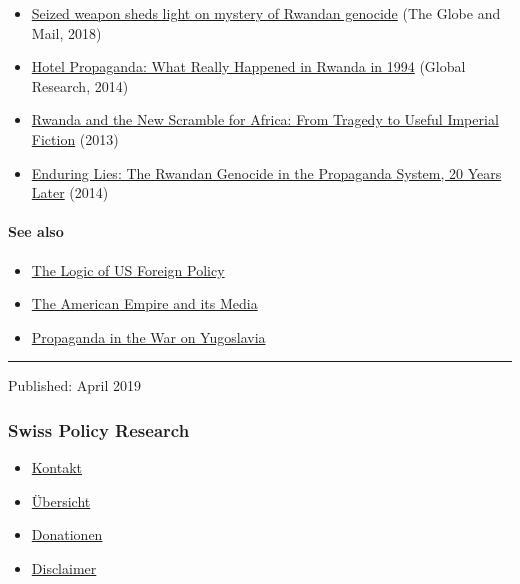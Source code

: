 \begin{itemize}
\tightlist
\item
  \href{https://www.theglobeandmail.com/news/world/seized-weapon-sheds-light-on-mystery-of-rwandan-genocide/article34125905/}{Seized
  weapon sheds light on mystery of Rwandan genocide} (The Globe and
  Mail, 2018)
\item
  \href{https://www.globalresearch.ca/hotel-propaganda-what-really-happened-in-rwanda-in-1994/5403235}{Hotel
  Propaganda: What Really Happened in Rwanda in 1994} (Global Research,
  2014)
\item
  \href{https://www.amazon.de/Rwanda-New-Scramble-Africa-Imperial/dp/1926824946}{Rwanda
  and the New Scramble for Africa: From Tragedy to Useful Imperial
  Fiction} (2013)
\item
  \href{https://www.amazon.de/Enduring-Lies-Rwandan-Genocide-Propaganda/dp/1500751111/}{Enduring
  Lies: The Rwandan Genocide in the Propaganda System, 20 Years Later}
  (2014)
\end{itemize}

\hypertarget{see-also}{%
\paragraph{See also}\label{see-also}}

\begin{itemize}
\tightlist
\item
  \href{https://swprs.org/us-foreign-policy/}{The Logic of US Foreign
  Policy}
\item
  \href{https://swprs.org/the-american-empire-and-its-media/}{The
  American Empire and its Media}
\item
  \href{https://swprs.org/propaganda-in-the-war-on-yugoslavia/}{Propaganda
  in the War on Yugoslavia}
\end{itemize}

\begin{center}\rule{0.5\linewidth}{\linethickness}\end{center}

Published: April 2019

\hypertarget{swiss-policy-research}{%
\subsubsection{Swiss Policy Research}\label{swiss-policy-research}}

\begin{itemize}
\tightlist
\item
  \href{https://swprs.org/kontakt/}{Kontakt}
\item
  \href{https://swprs.org/uebersicht/}{Übersicht}
\item
  \href{https://swprs.org/donationen/}{Donationen}
\item
  \href{https://swprs.org/disclaimer/}{Disclaimer}
\end{itemize}

